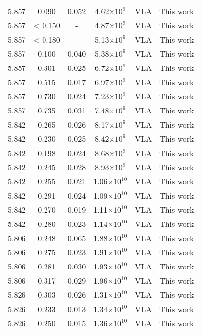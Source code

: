 \documentclass{aa}
\begin{document}
{\begin{longtable}{c|c|c|c|c|c}
  5.857 &   0.090   &  0.052 &  4.62$\times 10^{9}$  &  VLA & This work \\
  5.857 &   < 0.150 &  -     &  4.87$\times 10^{9}$  &  VLA & This work \\
  5.857 &   < 0.180 &  -     &  5.13$\times 10^{9}$  &  VLA & This work \\
  5.857 &   0.100   &  0.040 &  5.38$\times 10^{9}$  &  VLA & This work \\
  5.857 &   0.301   &  0.025 &  6.72$\times 10^{9}$  &  VLA & This work \\
  5.857 &   0.515   &  0.017 &  6.97$\times 10^{9}$  &  VLA & This work \\
  5.857 &   0.730   &  0.024 &  7.23$\times 10^{9}$  &  VLA & This work \\
  5.857 &   0.735   &  0.031 &  7.48$\times 10^{9}$  &  VLA & This work \\
  5.842 &   0.265   &  0.026 &  8.17$\times 10^{9}$  &  VLA & This work \\
  5.842 &   0.230   &  0.025 &  8.42$\times 10^{9}$  &  VLA & This work \\
  5.842 &   0.198   &  0.024 &  8.68$\times 10^{9}$  &  VLA & This work \\
  5.842 &   0.245   &  0.028 &  8.93$\times 10^{9}$  &  VLA & This work \\
  5.842 &   0.255   &  0.021 &  1.06$\times 10^{10}$ &  VLA & This work \\
  5.842 &   0.291   &  0.024 &  1.09$\times 10^{10}$ &  VLA & This work \\
  5.842 &   0.270   &  0.019 &  1.11$\times 10^{10}$ &  VLA & This work \\
  5.842 &   0.280   &  0.023 &  1.14$\times 10^{10}$ &  VLA & This work \\
  5.806 &   0.248   &  0.065 &  1.88$\times 10^{10}$ &  VLA & This work \\
  5.806 &   0.275   &  0.023 &  1.91$\times 10^{10}$ &  VLA & This work \\
  5.806 &   0.281   &  0.030 &  1.93$\times 10^{10}$ &  VLA & This work \\
  5.806 &   0.317   &  0.029 &  1.96$\times 10^{10}$ &  VLA & This work \\
  5.826 &   0.303   &  0.026 &  1.31$\times 10^{10}$ &  VLA & This work \\
  5.826 &   0.233   &  0.013 &  1.34$\times 10^{10}$ &  VLA & This work \\
  5.826 &   0.250   &  0.015 &  1.36$\times 10^{10}$ &  VLA & This work \\

\end{longtable}}
\end{document}
